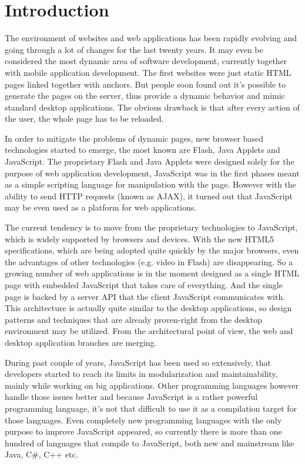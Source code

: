 \documentclass[12pt,a4paper]{report}
\begin{document}
\newpage
\pagestyle{plain}
\setcounter{page}{1}
\tableofcontents



\chapter{Introduction}

The environment of websites and web applications has been rapidly evolving and going through a lot of changes for the last twenty years. It may even be considered the most dynamic area of software development, currently together with mobile application development. The first websites were just static HTML pages linked together with anchors. But people soon found out it's possible to generate the pages on the server, thus provide a dynamic behavior and mimic standard desktop applications. The obvious drawback is that after every action of the user, the whole page has to be reloaded. 

In order to mitigate the problems of dynamic pages, new browser based technologies started to emerge, the most known are Flash, Java Applets and JavaScript. The proprietary Flash and Java Applets were designed solely for the purpose of web application development, JavaScript was in the first phases meant as a simple scripting language for manipulation with the page. However with the ability to send HTTP requests (known as AJAX), it turned out that JavaScript may be even used as a platform for web applications. 

The current tendency is to move from the proprietary technologies to JavaScript, which is widely supported by browsers and devices. With the new HTML5 specifications, which are being adopted quite quickly by the major browsers, even the advantages of other technologies (e.g. video in Flash) are disappearing. So a growing number of web applications is in the moment designed as a single HTML page with embedded JavaScript that takes care of everything. And the single page is backed by a server API that the client JavaScript communicates with. This architecture is actually quite similar to the desktop applications, so design patterns and techniques that are already proven-right from the desktop environment may be utilized. From the architectural point of view, the web and desktop application branches are merging.

During past couple of years, JavaScript has been used so extensively, that developers started to reach its limits in modularization and maintainability, mainly while working on big applications. Other programming languages however handle those issues better and because JavaScript is a rather powerful programming language, it's not that difficult to use it as a compilation target for those languages. Even completely new programming languages with the only purpose to improve JavaScript appeared, so currently there is more than one hundred of languages that compile to JavaScript\cite{backends}, both new and mainstream like Java, C\#, C++ etc.
\end{document}
